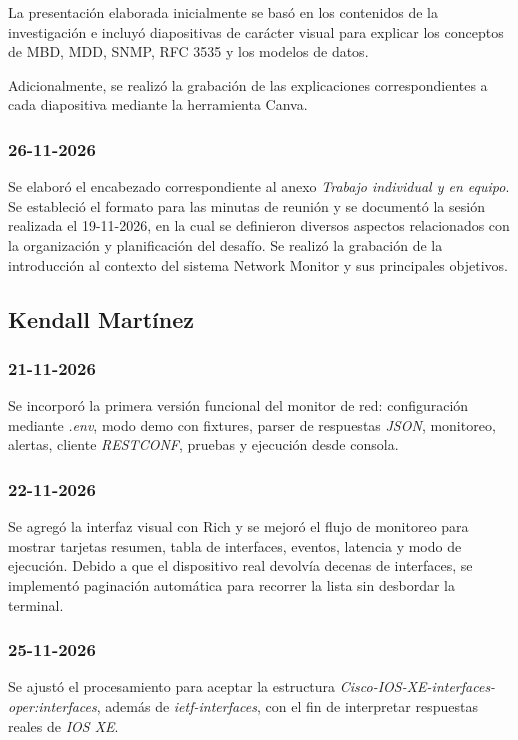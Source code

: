 \documentclass[12pt,a4paper]{article}
\begin{document}
La presentación elaborada inicialmente se basó en los contenidos de la investigación e incluyó diapositivas de carácter visual para explicar los conceptos de MBD, MDD, SNMP, RFC 3535 y los modelos de datos.

Adicionalmente, se realizó la grabación de las explicaciones correspondientes a cada diapositiva mediante la herramienta Canva.

\subsubsection{26-11-2026}
Se elaboró el encabezado correspondiente al anexo \textit{Trabajo individual y en equipo}. 
Se estableció el formato para las minutas de reunión y se documentó la sesión realizada el 19-11-2026, en la cual se definieron diversos aspectos relacionados con la organización y planificación del desafío.
Se realizó la grabación de la introducción al contexto del sistema Network Monitor y sus principales objetivos.

\subsection{Kendall Martínez}

\subsubsection{21-11-2026}
Se incorporó la primera versión funcional del monitor de red: configuración mediante \textit{.env}, modo demo con fixtures, parser de respuestas \textit{JSON}, monitoreo, alertas, cliente \textit{RESTCONF}, pruebas y ejecución desde consola.

\subsubsection{22-11-2026}
Se agregó la interfaz visual con Rich y se mejoró el flujo de monitoreo para mostrar tarjetas resumen, tabla de interfaces, eventos, latencia y modo de ejecución. Debido a que el dispositivo real devolvía decenas de interfaces, se implementó paginación automática para recorrer la lista sin desbordar la terminal.

\subsubsection{25-11-2026}
Se ajustó el procesamiento para aceptar la estructura \textit{Cisco-IOS-XE-interfaces-oper:interfaces}, además de \textit{ietf-interfaces}, con el fin de interpretar respuestas reales de \textit{IOS XE}.
\end{document}
